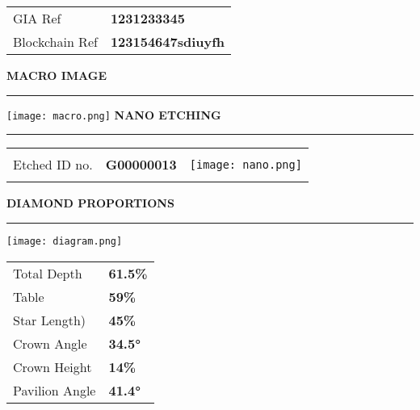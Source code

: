 \documentclass[12pt,landscape]{article}%
\begin{document}
\begin{minipage}[t]{1\textwidth}
\begin{minipage}[t]{0.33333\textwidth}
\begin{minipage}[t]{0.9\textwidth}
\begin{tabular}{l l}
GIA Ref&\textbf{1231233345}\\%
Blockchain Ref&\textbf{123154647sdiuyfh}\\%
\end{tabular}%
\vspace*{2em}%
\linebreak%
\color{MyBlue}%
\textbf{MACRO IMAGE\newline%
}%
\noindent\rule{\textwidth}{0.5mm}%
\vspace*{1em}%
\linebreak%
\color{MyDarkGrey}%
\texttt{[image: macro.png]}%
\vspace*{2em}%
\linebreak%
\color{MyBlue}%
\textbf{NANO ETCHING\newline%
}%
\noindent\rule{\textwidth}{0.5mm}%
\vspace*{1em}%
\linebreak%
\color{MyDarkGrey}%
\renewcommand{\arraystretch}{1.3}%
\setlength{\tabcolsep}{0.3em}%
\begin{tabular}{l l l}%
&&\multirow{3}{*}{\texttt{[image: nano.png]}}\\%
Etched ID no.&\textbf{G00000013}&\\%
&&\\%
\end{tabular}%
\end{minipage}%
\end{minipage}%
\begin{minipage}[t]{0.33333\textwidth}%
\centering%
\begin{minipage}[t]{0.9\textwidth}%
\flushleft%
\color{MyBlue}%
\textbf{DIAMOND PROPORTIONS\newline%
}%
\noindent\rule{\textwidth}{0.5mm}%
\vspace*{1em}%
\linebreak%
\color{MyDarkGrey}%
\texttt{[image: diagram.png]}%
\vspace*{1em}%
\linebreak%
\renewcommand{\arraystretch}{1.1}%
\setlength{\tabcolsep}{1em}%
\begin{tabular}{l l}%
Total Depth&\textbf{61.5\%}\\%
Table&\textbf{59\%}\\%
Star Length)&\textbf{45\%}\\%
Crown Angle&\textbf{34.5°}\\%
Crown Height&\textbf{14\%}\\%
Pavilion Angle&\textbf{41.4°}\\%

\end{tabular}
\end{minipage}
\end{minipage}
\end{minipage}
\end{document}
